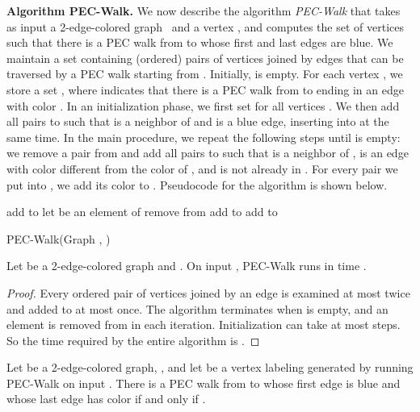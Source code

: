 \documentclass{llncs}
\newcommand{\longversion}[1]{#1}
\def\hy{\hbox{-}\nobreak\hskip0pt} \newcommand{\ellipsis}{}
\begin{document}
\noindent \textbf{Algorithm PEC-Walk.} We now describe the algorithm
\emph{PEC-Walk} that takes as input a 2\hy edge\hy colored graph~ and a
vertex , and computes the set of vertices  such that there is a
PEC walk from  to  whose first and last edges are blue. We maintain a
set  containing (ordered) pairs of vertices  joined by edges that
can be traversed by a PEC walk starting from . Initially,  is empty. For
each vertex , we store a set , where  indicates that there is a PEC walk
from  to  ending in an edge with color . In an initialization phase,
we first set  for all vertices . We then add all pairs
 to  such that  is a neighbor of  and  is a blue edge,
inserting  into  at the same time. In the main
procedure, we repeat the following steps until  is empty: we remove a pair
 from  and add all pairs  to  such that  is a neighbor
of ,  is an edge with color  different from the color of , and
 is not already in . For every pair  we put into , we
add its color to . \longversion{Pseudocode for the algorithm is shown
  below. \begin{algorithm}
\renewcommand{\thealgorithm}{}
\begin{algorithmic}[1]
\ForAll{} 
\State 
\EndFor
\Statex
\ForAll{ with } 
\State add  to 
\State 
\EndFor
\Statex
\While{}
\State let  be an element of 
\State remove  from 
\ForAll{ such that }
\If {}
\State add  to 
\State add  to 
\EndIf
\EndFor
\EndWhile
\end{algorithmic}
\caption{PEC-Walk(Graph , )}
\end{algorithm}
 }
\begin{lemma}\label{lem:linearAlgorithm}
  Let  be a 2\hy edge\hy colored graph and . On input
  , \mbox{PEC-Walk} runs in time .
\end{lemma}
\begin{proof}
  Every ordered pair of vertices joined by an edge is examined at most twice
  and added to  at most once. The algorithm terminates when  is empty,
  and an element is removed from  in each iteration. Initialization can
  take at most  steps. So the time
  required by the entire algorithm is .
\end{proof}
\begin{lemma} \label{lem:algorithm} Let  be a 2\hy edge\hy colored graph,
  , and let  be a vertex labeling generated by
  running {PEC-Walk} on input . There is a PEC walk
  from  to  whose first edge is blue and whose last edge has color  if and only if .
\end{lemma}
\end{document}
